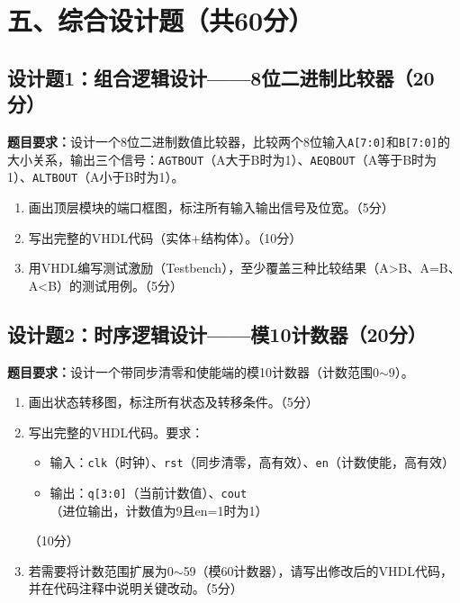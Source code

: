 \section*{五、综合设计题（共60分）}

\subsection*{设计题1：组合逻辑设计——8位二进制比较器（20分）}

\begin{framed}
\textbf{题目要求：}设计一个8位二进制数值比较器，比较两个8位输入\texttt{A[7:0]}和\texttt{B[7:0]}的大小关系，输出三个信号：\texttt{AGTBOUT}（A大于B时为1）、\texttt{AEQBOUT}（A等于B时为1）、\texttt{ALTBOUT}（A小于B时为1）。

\begin{enumerate}[label=(\arabic*)]
  \item 画出顶层模块的端口框图，标注所有输入输出信号及位宽。（5分）
  \item 写出完整的VHDL代码（实体+结构体）。（10分）
  \item 用VHDL编写测试激励（Testbench），至少覆盖三种比较结果（A>B、A=B、A<B）的测试用例。（5分）
\end{enumerate}
\end{framed}

\subsection*{设计题2：时序逻辑设计——模10计数器（20分）}

\begin{framed}
\textbf{题目要求：}设计一个带同步清零和使能端的模10计数器（计数范围0$\sim$9）。

\begin{enumerate}[label=(\arabic*)]
  \item 画出状态转移图，标注所有状态及转移条件。（5分）
  \item 写出完整的VHDL代码。要求：
  \begin{itemize}
    \item 输入：\texttt{clk}（时钟）、\texttt{rst}（同步清零，高有效）、\texttt{en}（计数使能，高有效）
    \item 输出：\texttt{q[3:0]}（当前计数值）、\texttt{cout}（进位输出，计数值为9且en=1时为1）
  \end{itemize}
  （10分）
  \item 若需要将计数范围扩展为0$\sim$59（模60计数器），请写出修改后的VHDL代码，并在代码注释中说明关键改动。（5分）
\end{enumerate}
\end{framed}

